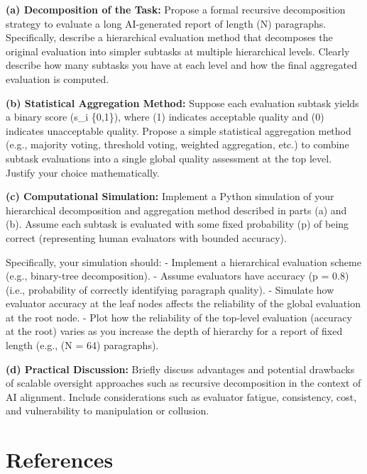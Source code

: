 \documentclass[
  letterpaper,
  numbers=noenddot,
  DIV=11]{scrreprt}
\theoremstyle{plain}
\theoremstyle{definition}
\theoremstyle{remark}
\begin{document}
\textbf{(a) Decomposition of the Task:} Propose a formal recursive
decomposition strategy to evaluate a long AI-generated report of length
(N) paragraphs. Specifically, describe a hierarchical evaluation method
that decomposes the original evaluation into simpler subtasks at
multiple hierarchical levels. Clearly describe how many subtasks you
have at each level and how the final aggregated evaluation is computed.

\textbf{(b) Statistical Aggregation Method:} Suppose each evaluation
subtask yields a binary score (s\_i \in \{0,1\}), where (1) indicates
acceptable quality and (0) indicates unacceptable quality. Propose a
simple statistical aggregation method (e.g., majority voting, threshold
voting, weighted aggregation, etc.) to combine subtask evaluations into
a single global quality assessment at the top level. Justify your choice
mathematically.

\textbf{(c) Computational Simulation:} Implement a Python simulation of
your hierarchical decomposition and aggregation method described in
parts (a) and (b). Assume each subtask is evaluated with some fixed
probability (p) of being correct (representing human evaluators with
bounded accuracy).

Specifically, your simulation should: - Implement a hierarchical
evaluation scheme (e.g., binary-tree decomposition). - Assume evaluators
have accuracy (p = 0.8) (i.e., probability of correctly identifying
paragraph quality). - Simulate how evaluator accuracy at the leaf nodes
affects the reliability of the global evaluation at the root node. -
Plot how the reliability of the top-level evaluation (accuracy at the
root) varies as you increase the depth of hierarchy for a report of
fixed length (e.g., (N = 64) paragraphs).

\textbf{(d) Practical Discussion:} Briefly discuss advantages and
potential drawbacks of scalable oversight approaches such as recursive
decomposition in the context of AI alignment. Include considerations
such as evaluator fatigue, consistency, cost, and vulnerability to
manipulation or collusion.

\section*{References}\label{bibliography-6}

\end{document}
